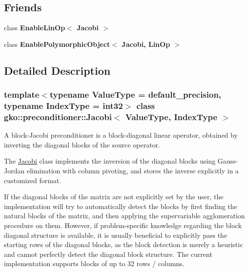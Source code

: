 \subsection*{Friends}
\begin{DoxyCompactItemize}
\item 
\mbox{\label{classgko_1_1preconditioner_1_1Jacobi_a075afbb3255d2c3c69f12606ad8b9562}} 
class {\bfseries Enable\+Lin\+Op$<$ Jacobi $>$}
\item 
\mbox{\label{classgko_1_1preconditioner_1_1Jacobi_ab0d6f1315713055f51f5ffdcfff1ecab}} 
class {\bfseries Enable\+Polymorphic\+Object$<$ Jacobi, Lin\+Op $>$}
\end{DoxyCompactItemize}


\subsection{Detailed Description}
\subsubsection*{template$<$typename Value\+Type = default\+\_\+precision, typename Index\+Type = int32$>$\newline
class gko\+::preconditioner\+::\+Jacobi$<$ Value\+Type, Index\+Type $>$}

A block-\/\+Jacobi preconditioner is a block-\/diagonal linear operator, obtained by inverting the diagonal blocks of the source operator. 

The \hyperlink{classgko_1_1preconditioner_1_1Jacobi}{Jacobi} class implements the inversion of the diagonal blocks using Gauss-\/\+Jordan elimination with column pivoting, and stores the inverse explicitly in a customized format.

If the diagonal blocks of the matrix are not explicitly set by the user, the implementation will try to automatically detect the blocks by first finding the natural blocks of the matrix, and then applying the supervariable agglomeration procedure on them. However, if problem-\/specific knowledge regarding the block diagonal structure is available, it is usually beneficial to explicitly pass the starting rows of the diagonal blocks, as the block detection is merely a heuristic and cannot perfectly detect the diagonal block structure. The current implementation supports blocks of up to 32 rows / columns.

